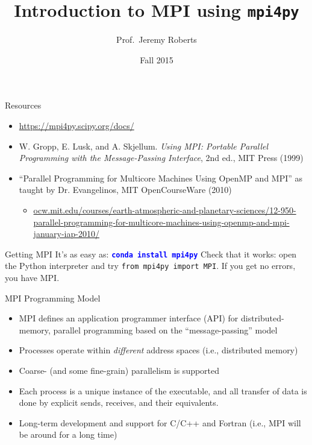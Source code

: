 \documentclass[10pt,handout]{beamer}
\title %
[MPI in Python]{Introduction to MPI using {\tt mpi4py}}
\author[Roberts]{Prof.~Jeremy Roberts}
\date
{Fall 2015}
\begin{document}
\begin{frame}[plain]
  \titlepage
\end{frame}


\begin{frame}{Resources}
 
\begin{itemize}
 \item \url{https://mpi4py.scipy.org/docs/}
 \item W. Gropp, E. Lusk, and A. Skjellum. 
       {\it Using MPI: Portable Parallel Programming with the Message-Passing 
       Interface}, 2nd ed., MIT Press (1999)
 \item ``Parallel Programming for Multicore Machines Using OpenMP and MPI''
       as taught by Dr. Evangelinos, MIT OpenCourseWare (2010)
       \begin{itemize}
         \item \url{ocw.mit.edu/courses/earth-atmospheric-and-planetary-sciences/12-950-parallel-programming-for-multicore-machines-using-openmp-and-mpi-january-iap-2010/}
       \end{itemize}
\end{itemize}
 
\end{frame}

\begin{frame}{Getting MPI}
It's as easy as:
\vfill
 {\Large\bf \textcolor{blue}{\tt conda install mpi4py}}
\vfill
Check that it works: open the Python interpreter and 
try {\tt from mpi4py import MPI}. If you get no errors, you have MPI.
\end{frame}


\begin{frame}{MPI Programming Model}

\begin{itemize}
 \item MPI defines an application programmer interface (API) for 
       distributed-memory, parallel programming based on the ``message-passing'' model
 \item Processes operate within {\it different} address spaces (i.e., distributed memory)
 \item Coarse- (and some fine-grain) parallelism is supported
 \item Each process is a unique instance of the executable, and all transfer of 
       data is done by explicit sends, receives, and their equivalents.
\item  Long-term development and support for C/C++ and Fortran (i.e.,
       MPI will be around for a long time)
\end{itemize}

\end{frame}
\end{document}
